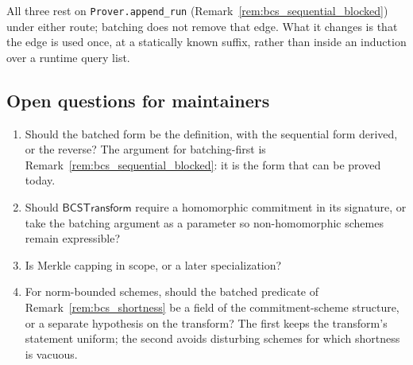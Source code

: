 All three rest on \texttt{Prover.append\_run} (Remark~\ref{rem:bcs_sequential_blocked}) under
either route; batching does not remove that edge. What it changes is that the edge is used once,
at a statically known suffix, rather than inside an induction over a runtime query list.

\subsection{Open questions for maintainers}\label{sec:bcs_questions}

\begin{enumerate}
    \item Should the batched form be the definition, with the sequential form derived, or the
        reverse? The argument for batching-first is Remark~\ref{rem:bcs_sequential_blocked}: it is
        the form that can be proved today.
    \item Should $\mathsf{BCSTransform}$ require a homomorphic commitment in its signature, or take
        the batching argument as a parameter so non-homomorphic schemes remain expressible?
    \item Is Merkle capping in scope, or a later specialization?
    \item For norm-bounded schemes, should the batched predicate of
        Remark~\ref{rem:bcs_shortness} be a field of the commitment-scheme structure, or a separate
        hypothesis on the transform? The first keeps the transform's statement uniform; the second
        avoids disturbing schemes for which shortness is vacuous.
\end{enumerate}
